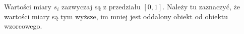 \documentclass[12pt,a4paper]{report}
\begin{document}
Wartości miary $s_{i}$ zazwyczaj są z przedziału $[0, 1]$. Należy tu zaznaczyć, że wartości miary są tym wyższe, im mniej jest oddalony obiekt od obiektu wzorcowego. 

%
%
%
%
%
%
%
%
%
%
\end{document}
